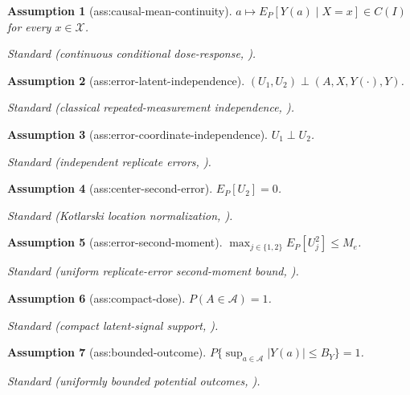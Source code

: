 \documentclass{article}
\newtheorem{assumption}{Assumption}
\begin{document}
\begin{assumption}[ass:causal-mean-continuity]\label{ass:causal-mean-continuity}
\(a\mapsto E_P[Y(a)\mid X=x]\in C(I)\) for every \(x\in\mathcal X\).
\par\smallskip\noindent\emph{Standard} (continuous conditional dose-response, \cite{KennedyMaMcHughSmall2017}).
\end{assumption}

\begin{assumption}[ass:error-latent-independence]\label{ass:error-latent-independence}
\((U_1,U_2)\perp(A,X,Y(\cdot),Y)\).
\par\smallskip\noindent\emph{Standard} (classical repeated-measurement independence, \cite{CapitaoMiniconiGassiatLehericy2025}).
\end{assumption}

\begin{assumption}[ass:error-coordinate-independence]\label{ass:error-coordinate-independence}
\(U_1\perp U_2\).
\par\smallskip\noindent\emph{Standard} (independent replicate errors, \cite{CapitaoMiniconiGassiatLehericy2025}).
\end{assumption}

\begin{assumption}[ass:center-second-error]\label{ass:center-second-error}
\(E_P[U_2]=0\).
\par\smallskip\noindent\emph{Standard} (Kotlarski location normalization, \cite{KatoSasakiUra2021}).
\end{assumption}

\begin{assumption}[ass:error-second-moment]\label{ass:error-second-moment}
\(\max_{j\in\{1,2\}}E_P[U_j^2]\le M_e\).
\par\smallskip\noindent\emph{Standard} (uniform replicate-error second-moment bound, \cite{CapitaoMiniconiGassiatLehericy2025}).
\end{assumption}

\begin{assumption}[ass:compact-dose]\label{ass:compact-dose}
\(P(A\in\mathcal A)=1\).
\par\smallskip\noindent\emph{Standard} (compact latent-signal support, \cite{CapitaoMiniconiGassiatLehericy2025}).
\end{assumption}

\begin{assumption}[ass:bounded-outcome]\label{ass:bounded-outcome}
\(P\{\sup_{a\in\mathcal A}|Y(a)|\le B_Y\}=1\).
\par\smallskip\noindent\emph{Standard} (uniformly bounded potential outcomes, \cite{HuangZhang2023}).
\end{assumption}
\end{document}
